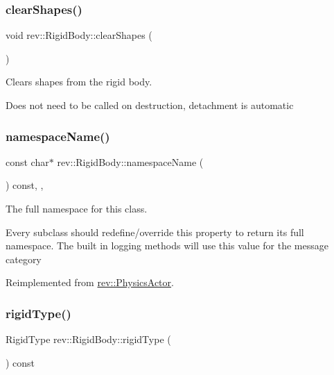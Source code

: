 \mbox{\label{classrev_1_1_rigid_body_a662213185d960bb925af824c1372330f}} 
\subsubsection{\texorpdfstring{clearShapes()}{clearShapes()}}
{\footnotesize\ttfamily void rev\+::\+Rigid\+Body\+::clear\+Shapes (\begin{DoxyParamCaption}{ }\end{DoxyParamCaption})}



Clears shapes from the rigid body. 

Does not need to be called on destruction, detachment is automatic \mbox{\label{classrev_1_1_rigid_body_ae8e178b51dbe0e61ad0674e039864a92}} 
\subsubsection{\texorpdfstring{namespaceName()}{namespaceName()}}
{\footnotesize\ttfamily const char$\ast$ rev\+::\+Rigid\+Body\+::namespace\+Name (\begin{DoxyParamCaption}{ }\end{DoxyParamCaption}) const\hspace{0.3cm}{\ttfamily [inline]}, {\ttfamily [override]}, {\ttfamily [virtual]}}



The full namespace for this class. 

Every subclass should redefine/override this property to return its full namespace. The built in logging methods will use this value for the message category 

Reimplemented from \mbox{\hyperlink{classrev_1_1_physics_actor_ad212df8d7d61f9b855bc9d9ede2b437f}{rev\+::\+Physics\+Actor}}.

\mbox{\label{classrev_1_1_rigid_body_adfc7cfb9e55c5e70818f2c2a54063468}} 
\subsubsection{\texorpdfstring{rigidType()}{rigidType()}}
{\footnotesize\ttfamily Rigid\+Type rev\+::\+Rigid\+Body\+::rigid\+Type (\begin{DoxyParamCaption}{ }\end{DoxyParamCaption}) const\hspace{0.3cm}{\ttfamily [inline]}}



